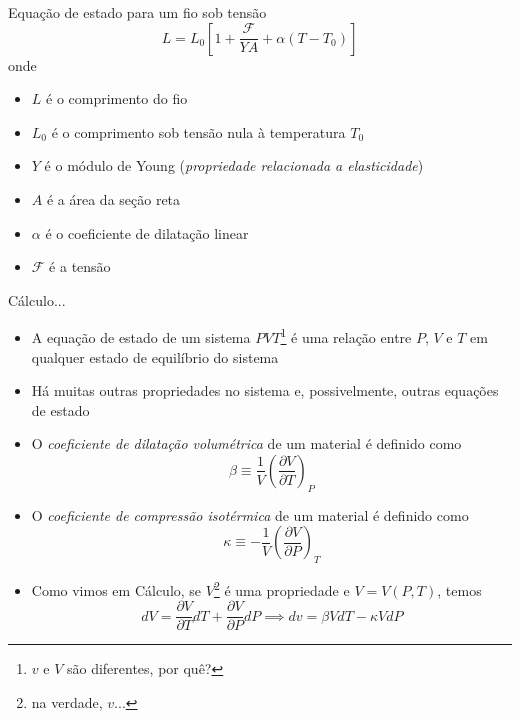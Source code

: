 \begin{frame}[c]{Equação de estado para um fio sob tensão}
    \[
        L=L_0 \left[ 1+ \frac{\mathcal{F}}{YA}+\alpha (T-T_0) \right]
    \]
    onde 
    \begin{itemize}
        \item \(L\) é o comprimento do fio
        \item \(L_0\) é o comprimento sob tensão nula à temperatura \(T_0\)
        \item \(Y\) é o módulo de Young (\textit{propriedade relacionada a elasticidade})
        \item \(A\) é a área da seção reta
        \item \(\alpha\) é o coeficiente de dilatação linear
        \item \(\mathcal{F}\) é a tensão
    \end{itemize}
\end{frame}

\begin{frame}{Cálculo...}
    \begin{itemize}
        \item A equação de estado de um sistema \(PVT\)\footnote{\(v\) e \(V\) são diferentes, por quê?} 
            é uma relação entre \(P\), \(V\) e \(T\) em qualquer estado de equilíbrio do sistema
        \item Há muitas outras propriedades no sistema e, possivelmente, outras equações de estado
        \item O \textit{coeficiente de dilatação volumétrica} de um material é definido como
            \[
                \beta \equiv \frac{1}{V}\left(\frac{\partial V}{\partial T}\right)_P
            \]
        \item O \textit{coeficiente de compressão isotérmica} de um material é definido como
            \[
                \kappa \equiv -\frac{1}{V}\left(\frac{\partial V}{\partial P}\right)_T
            \]
        \item Como vimos em Cálculo, se \(V\)\footnote{na verdade, \(v\)...} é uma propriedade e \(V=V(P,T)\), temos
            \[
                dV = \frac{\partial V}{\partial T} dT + \frac{\partial V}{\partial P} dP 
                \implies dv = \beta V dT - \kappa V dP
            \]
    \end{itemize}
\end{frame}

